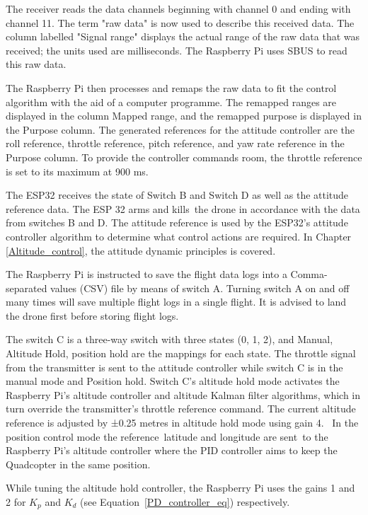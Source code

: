 \documentclass{article}
\begin{document}
The receiver reads the data channels beginning with channel 0 and ending with channel 11. The term "raw data" is now used to describe this received data. The column labelled "Signal range" displays the actual range of the raw data that was received; the units used are milliseconds. The Raspberry Pi uses SBUS to read this raw data.

The Raspberry Pi then processes and remaps the raw data to fit the control algorithm with the aid of a computer programme. The remapped ranges are displayed in the column Mapped range, and the remapped purpose is displayed in the Purpose column. The generated references for the attitude controller are the roll reference, throttle reference, pitch reference, and yaw rate reference in the Purpose column.
To provide the controller commands room, the throttle reference is set to its maximum at 900 ms.

The ESP32 receives the state of Switch B and Switch D as well as the attitude reference data. The ESP 32  arms and kills the drone in accordance with the data from switches B and D. The attitude reference is used by the ESP32's attitude controller algorithm to determine what control actions are required. In Chapter \ref{Altitude_control}, the attitude dynamic principles is covered. 

The Raspberry Pi is instructed to save the flight data logs into a Comma-separated values (CSV) file by means of switch A. Turning switch A on and off many times will save multiple flight logs in a single flight. It is advised to land the drone first before storing flight logs.

The switch C is a three-way switch with three states ({0, 1, 2}), and {Manual, Altitude Hold, position hold} are the mappings for each state. The throttle signal from the transmitter is sent to the attitude controller while switch C is in the manual mode and Position hold. Switch C's altitude hold mode activates the Raspberry Pi's altitude controller and altitude Kalman filter algorithms, 
which in turn override the transmitter's throttle reference command. The current altitude reference is adjusted by ±0.25 metres in altitude hold mode using gain 4.  In the position control mode the reference latitude and longitude are sent to the Raspberry Pi's altitude controller where the PID controller aims to keep the Quadcopter in the same position.

While tuning the altitude hold controller, the Raspberry Pi uses the gains 1 and 2 for $K_{p}$ and ${K}_{d}$ (see Equation~\ref{PD_controller_eq}) respectively.
\end{document}
